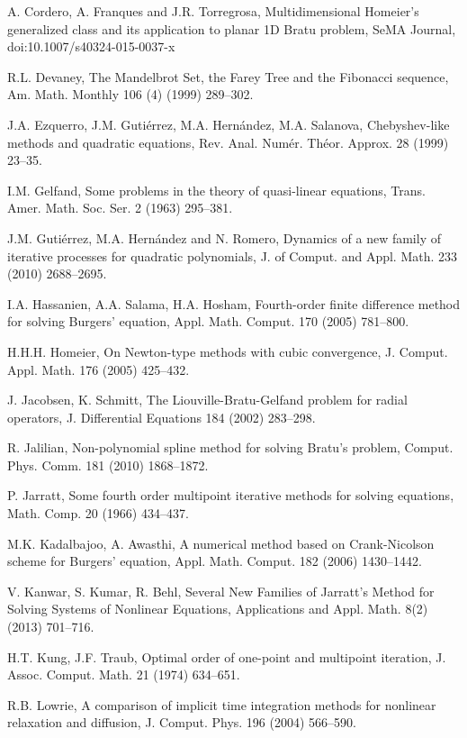 \begin{thebibliography}{199}
 A. Cordero, A. Franques and J.R. Torregrosa, Multidimensional Homeier's generalized class and its
application to planar 1D Bratu problem, SeMA Journal, doi:10.1007/s40324-015-0037-x

 R.L. Devaney, The Mandelbrot Set, the Farey Tree and the Fibonacci sequence, Am. Math. Monthly 106 (4) (1999) 289--302.

   J.A. Ezquerro, J.M. Guti\'errez, M.A. Hern\'{a}ndez, M.A. Salanova, Chebyshev-like methods and quadratic equations, {Rev. Anal. Num\'er.  Th\'eor. Approx.} 28 ({1999}) 23--35.

 I.M. Gelfand, Some problems in the theory of quasi-linear equations, Trans. Amer. Math. Soc. Ser. 2 (1963) 295--381.

 J.M. Guti\'errez, M.A. Hern\'andez and N. Romero,
Dynamics of a new family of iterative processes for quadratic polynomials,
J. of Comput. and Appl. Math.  233 (2010) 2688--2695.

  I.A. Hassanien, A.A. Salama, H.A. Hosham, Fourth-order finite difference method for solving Burgers' equation,
{Appl. Math. Comput.} 170 ({2005}) 781--800.

 H.H.H. Homeier, On Newton-type methods with cubic convergence, J. Comput. Appl. Math. 176 (2005) 425--432.

 J. Jacobsen, K. Schmitt, The Liouville-Bratu-Gelfand problem for radial operators, J. Differential Equations 184 (2002) 283--298.

 R. Jalilian, Non-polynomial spline method for solving Bratu's problem, Comput. Phys. Comm. 181 (2010) 1868--1872.

  P. Jarratt, Some fourth order multipoint iterative methods for solving equations, Math. Comp. 20 (1966) 434--437.

   M.K. Kadalbajoo, A. Awasthi,
A numerical method based on Crank-Nicolson scheme for Burgers' equation,   {Appl. Math. Comput.} 182 ({2006}) 1430--1442.

 V. Kanwar, S. Kumar, R. Behl, Several New Families of Jarratt's Method for Solving Systems of Nonlinear Equations,
Applications and Appl. Math. 8(2) (2013) 701--716.

 H.T. Kung, J.F. Traub, Optimal order of one-point and multipoint
iteration, J. Assoc. Comput. Math. 21 (1974) 634--651.

  R.B. Lowrie, A comparison of implicit time integration methods for nonlinear relaxation and diffusion, {J. Comput. Phys.} 196 {(2004)} 566--590.


\end{thebibliography}
